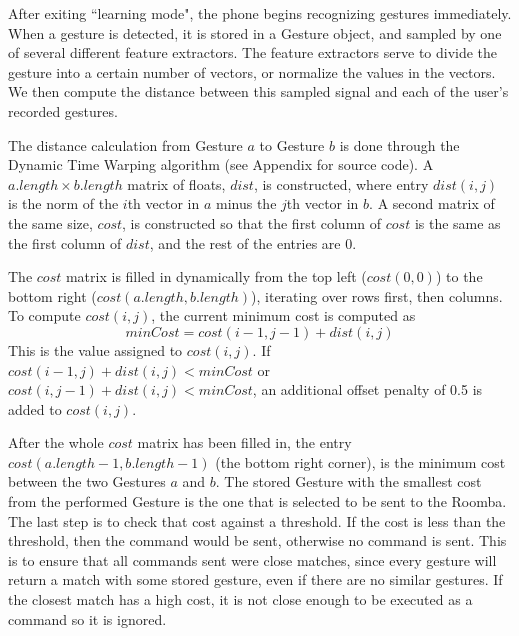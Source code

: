 \documentclass[12pt, letterpaper]{report}
\begin{document}
After exiting ``learning mode", the phone begins recognizing gestures immediately. When a gesture is detected, it is stored in a Gesture object, and sampled by one of several different feature extractors. The feature extractors serve to divide the gesture into a certain number of vectors, or normalize the values in the vectors. We then compute the distance between this sampled signal and each of the user's recorded gestures.

The distance calculation from Gesture $a$ to Gesture $b$ is done through the Dynamic Time Warping algorithm (see Appendix for source code). A $a.length \times b.length$ matrix of floats, $dist$, is constructed, where entry $dist(i,j)$ is the norm of the $i$th vector in $a$ minus the $j$th vector in $b$. A second matrix of the same size, $cost$, is constructed so that the first column of $cost$ is the same as the first column of $dist$, and the rest of the entries are 0.

The $cost$ matrix is filled in dynamically from the top left ($cost(0, 0)$) to the bottom right ($cost(a.length, b.length)$), iterating over rows first, then columns. To compute $cost(i, j)$, the current minimum cost is computed as \[minCost = cost(i - 1, j - 1) + dist(i, j)\] This is the value assigned to $cost(i, j)$. If $cost(i - 1, j) + dist(i, j) < minCost$ or $cost(i, j - 1) + dist(i, j) < minCost$, an additional offset penalty of 0.5 is added to $cost(i, j)$.

After the whole $cost$ matrix has been filled in, the entry $cost(a.length - 1, b.length - 1)$ (the bottom right corner), is the minimum cost between the two Gestures $a$ and $b$. The stored Gesture with the smallest cost from the performed Gesture is the one that is selected to be sent to the Roomba. The last step is to check that cost against a threshold. If the cost is less than the threshold, then the command would be sent, otherwise no command is sent. This is to ensure that all commands sent were close matches, since every gesture will return a match with some stored gesture, even if there are no similar gestures. If the closest match has a high cost, it is not close enough to be executed as a command so it is ignored.
\end{document}
